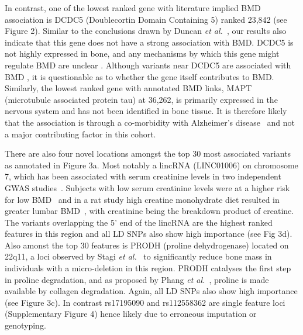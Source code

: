 \documentclass[10pt,letterpaper]{article}
\begin{document}
In contrast, one of the lowest ranked gene with literature implied BMD association is DCDC5 (Doublecortin Domain Containing 5) ranked 23,842
(see Figure 2).
Similar to the conclusions drawn by Duncan {\it et
  al.}~\cite{Duncan.2011}, our results also indicate that this gene does not have a strong association with BMD. DCDC5 is not highly expressed in bone, and any mechanisms by which this gene might regulate BMD are unclear
\cite{Thakker2012}.  Although variants near DCDC5 are associated with BMD \cite{Rivadeneira2009}, it is questionable as
to whether the gene itself contributes to BMD.
Similarly, the lowest ranked gene with annotated BMD links, MAPT (microtubule associated protein tau) at 36,262, is primarily expressed in the nervous system and has not been identified in bone tissue. 
It is therefore likely that the association is through a co-morbidity with Alzheimer's disease~\cite{Dengler-Crish2017} and not a major contributing factor in this cohort. 



There are also four novel locations amongst the top 30 most associated variants as annotated in Figure 3a.
Most notably a lincRNA (LINC01006) on chromosome 7, which has been associated with serum creatinine levels in two independent GWAS studies~\cite{Pattaro2010,Chambers2010}. 
Subjects with low serum creatinine levels were at a higher risk for low BMD~\cite{Huh2015} and in a rat study high creatine monohydrate diet resulted in greater lumbar BMD~\cite{Antolic2007}, 
with creatinine being the breakdown product of creatine. The variants overlapping the 5' end of the lincRNA are the highest ranked features in this region and all LD SNPs also show high importance (see Fig 3d). Also amonst the top 30 features is PRODH (proline dehydrogenase) located on 22q11, a loci observed by Stagi {\it
  et al.}~\cite{Stagi.2010} to significantly reduce bone mass in individuals with a micro-deletion in this region. 
PRODH catalyses the first step in proline degradation, and as proposed by Phang {\it et al.}~\cite{Phang.2008}, proline is made available by collagen degradation. 
Again, all LD SNPs also show high importance (see Figure 3c). %
In contrast rs17195090 and rs112558362 are single feature loci (Supplementary Figure 4) hence likely due to erroneous imputation or genotyping.
\end{document}

